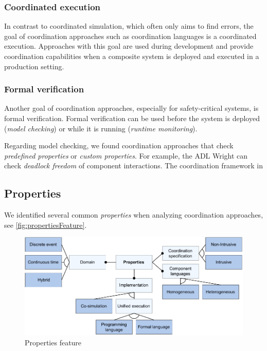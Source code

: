 \documentclass[runningheads]{llncs}
\begin{document}
\subsubsection{Coordinated execution} In contrast to coordinated simulation, which often only aims to find errors, the goal of coordination approaches such as coordination languages is a coordinated execution.
Approaches with this goal are used during development and provide coordination capabilities when a composite system is deployed and executed in a production setting.

\subsubsection{Formal verification} Another goal of coordination approaches, especially for safety-critical systems, is formal verification.
Formal verification can be used before the system is deployed (\textit{model checking}) or while it is running (\textit{runtime monitoring}).



Regarding model checking, we found coordination approaches that check \textit{predefined properties} or \textit{custom properties}.
For example, the ADL Wright \cite{allenFormalBasisArchitectural1997} can check \textit{deadlock freedom} of component interactions.
The coordination framework in \cite{krauterBehavioralConsistencyMultimodeling2023}

\subsection{Properties}
We identified several common \textit{properties} when analyzing coordination approaches, see \autoref{fig:propertiesFeature}.

\begin{figure}[ht]
	\centering
	\includegraphics[width=1\textwidth]{images/properties_feature}
	\caption{Properties feature}
	\label{fig:propertiesFeature}
\end{figure}
\end{document}
